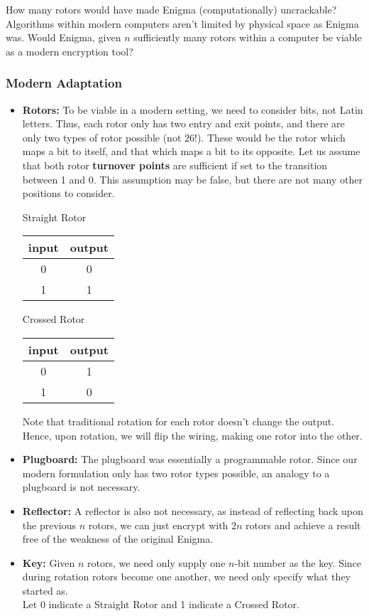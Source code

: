 \documentclass{article}
\begin{document}
How many rotors would have made Enigma (computationally)
uncrackable? Algorithms within modern computers aren't limited by physical
space as Enigma was.
Would Enigma, given $n$ sufficiently many
rotors within a computer be viable as a modern encryption tool?

\subsubsection{Modern Adaptation}
\begin{itemize}
\item \textbf{Rotors:} To be viable in a modern setting, we need to
  consider bits, not Latin letters. Thus, each rotor only has two entry
  and exit points, and
  there are only two types of rotor possible (not $26!$). These would be
  the rotor which maps a bit to itself, and that which maps a bit to
  its opposite. Let us assume that both rotor \textbf{turnover points} are
  sufficient if set to the transition between 1 and 0. This assumption may
  be false, but there are not many other positions to consider.
  \begin{center}
    Straight Rotor\\
    \begin{tabular}{c | c}
      input & output\\
      \hline
      0 & 0\\
      1 & 1
    \end{tabular}
  \end{center}
    \begin{center}
    Crossed Rotor\\
    \begin{tabular}{c | c}
      input & output\\
      \hline
      0 & 1\\
      1 & 0
    \end{tabular}
  \end{center}
    Note that traditional rotation for each rotor doesn't change the output.
    Hence, upon rotation, we will flip the wiring, making one rotor
    into the other.

\item \textbf{Plugboard:} The plugboard was essentially a programmable rotor.
 Since our modern formulation only has two rotor types possible, an analogy
 to a plugboard is not necessary.
\item \textbf{Reflector:} A reflector is also not necessary, as instead
  of reflecting back upon the previous $n$ rotors, we can just encrypt with
  $2n$ rotors and achieve a result free of the weakness of the original
  Enigma.
\item \textbf{Key:} Given $n$ rotors, we need only supply one $n$-bit
  number as the key. Since during rotation rotors become one another,
  we need only specify what they started as.\\
  Let $0$ indicate a Straight Rotor and 1 indicate a Crossed Rotor.

\end{itemize}
\end{document}
